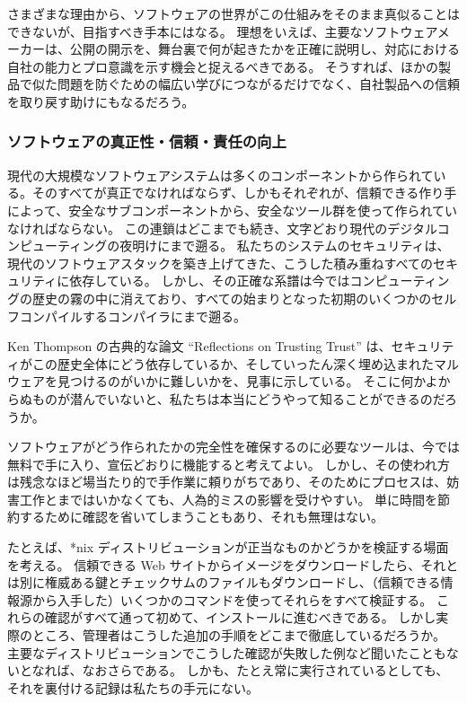 \documentclass[uplatex]{jsarticle}
\def\label#1{}%
\begin{document}
さまざまな理由から、ソフトウェアの世界がこの仕組みをそのまま真似ることはできないが、目指すべき手本にはなる。
理想をいえば、主要なソフトウェアメーカーは、公開の開示を、舞台裏で何が起きたかを正確に説明し、対応における自社の能力とプロ意識を示す機会と捉えるべきである。
そうすれば、ほかの製品で似た問題を防ぐための幅広い学びにつながるだけでなく、自社製品への信頼を取り戻す助けにもなるだろう。

\subsubsection{ソフトウェアの真正性・信頼・責任の向上}

現代の大規模なソフトウェアシステムは多くのコンポーネントから作られている。そのすべてが真正でなければならず、しかもそれぞれが、信頼できる作り手によって、安全なサブコンポーネントから、安全なツール群を使って作られていなければならない。
この連鎖はどこまでも続き、文字どおり現代のデジタルコンピューティングの夜明けにまで遡る。
私たちのシステムのセキュリティは、現代のソフトウェアスタックを築き上げてきた、こうした積み重ねすべてのセキュリティに依存している。
しかし、その正確な系譜は今ではコンピューティングの歴史の霧の中に消えており、すべての始まりとなった初期のいくつかのセルフコンパイルするコンパイラにまで遡る。

\begin{exa}\label{exa:ch14-trusting-trust}
Ken Thompson の古典的な論文 ``Reflections on Trusting Trust'' は、セキュリティがこの歴史全体にどう依存しているか、そしていったん深く埋め込まれたマルウェアを見つけるのがいかに難しいかを、見事に示している。
そこに何かよからぬものが潜んでいないと、私たちは本当にどうやって知ることができるのだろうか。
\end{exa}

ソフトウェアがどう作られたかの完全性を確保するのに必要なツールは、今では無料で手に入り、宣伝どおりに機能すると考えてよい。
しかし、その使われ方は残念なほど場当たり的で手作業に頼りがちであり、そのためにプロセスは、妨害工作とまではいかなくても、人為的ミスの影響を受けやすい。
単に時間を節約するために確認を省いてしまうこともあり、それも無理はない。

\begin{exa}\label{exa:ch14-verify-distro}
たとえば、*nix ディストリビューションが正当なものかどうかを検証する場面を考える。
信頼できる Web サイトからイメージをダウンロードしたら、それとは別に権威ある鍵とチェックサムのファイルもダウンロードし、（信頼できる情報源から入手した）いくつかのコマンドを使ってそれらをすべて検証する。
これらの確認がすべて通って初めて、インストールに進むべきである。
しかし実際のところ、管理者はこうした追加の手順をどこまで徹底しているだろうか。
主要なディストリビューションでこうした確認が失敗した例など聞いたこともないとなれば、なおさらである。
しかも、たとえ常に実行されているとしても、それを裏付ける記録は私たちの手元にない。
\end{exa}
\end{document}
